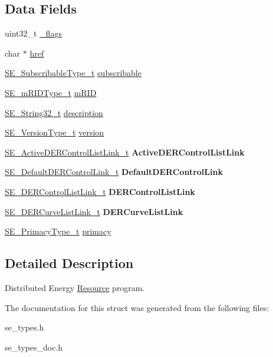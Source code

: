 \subsection*{Data Fields}
\begin{DoxyCompactItemize}
\item 
uint32\+\_\+t \hyperlink{group__DERProgram_ga9659c1a566294e642a8937f01a8f29a6}{\+\_\+flags}
\item 
char $\ast$ \hyperlink{group__DERProgram_ga41e32b7c2ca6700cd42ba11836b2665e}{href}
\item 
\hyperlink{group__SubscribableType_ga5c41f553d369710ed34619266bf2551e}{S\+E\+\_\+\+Subscribable\+Type\+\_\+t} \hyperlink{group__DERProgram_ga8798269512f178b07f8d02a1cedd6f54}{subscribable}
\item 
\hyperlink{group__mRIDType_gac74622112f3a388a2851b2289963ba5e}{S\+E\+\_\+m\+R\+I\+D\+Type\+\_\+t} \hyperlink{group__DERProgram_ga4d3682f58deb708053b4c09c1c63f58f}{m\+R\+ID}
\item 
\hyperlink{group__String32_gac9f59b06b168b4d2e0d45ed41699af42}{S\+E\+\_\+\+String32\+\_\+t} \hyperlink{group__DERProgram_ga9b079eeab8cef3afd53f741d84d2901d}{description}
\item 
\hyperlink{group__VersionType_ga4b8d27838226948397ed99f67d46e2ae}{S\+E\+\_\+\+Version\+Type\+\_\+t} \hyperlink{group__DERProgram_gaad375ff269dc0a412646ee4e5beeb68d}{version}
\item 
\hyperlink{structSE__ActiveDERControlListLink__t}{S\+E\+\_\+\+Active\+D\+E\+R\+Control\+List\+Link\+\_\+t} {\bfseries Active\+D\+E\+R\+Control\+List\+Link}
\item 
\hyperlink{structSE__DefaultDERControlLink__t}{S\+E\+\_\+\+Default\+D\+E\+R\+Control\+Link\+\_\+t} {\bfseries Default\+D\+E\+R\+Control\+Link}
\item 
\hyperlink{structSE__DERControlListLink__t}{S\+E\+\_\+\+D\+E\+R\+Control\+List\+Link\+\_\+t} {\bfseries D\+E\+R\+Control\+List\+Link}
\item 
\hyperlink{structSE__DERCurveListLink__t}{S\+E\+\_\+\+D\+E\+R\+Curve\+List\+Link\+\_\+t} {\bfseries D\+E\+R\+Curve\+List\+Link}
\item 
\hyperlink{group__PrimacyType_ga484b22ef8ff92c8801e6a8b7bd8351eb}{S\+E\+\_\+\+Primacy\+Type\+\_\+t} \hyperlink{group__DERProgram_gaefdd7cf83f9d937976f8eacc6433d963}{primacy}
\end{DoxyCompactItemize}


\subsection{Detailed Description}
Distributed Energy \hyperlink{structResource}{Resource} program. 

The documentation for this struct was generated from the following files\+:\begin{DoxyCompactItemize}
\item 
se\+\_\+types.\+h\item 
se\+\_\+types\+\_\+doc.\+h\end{DoxyCompactItemize}
